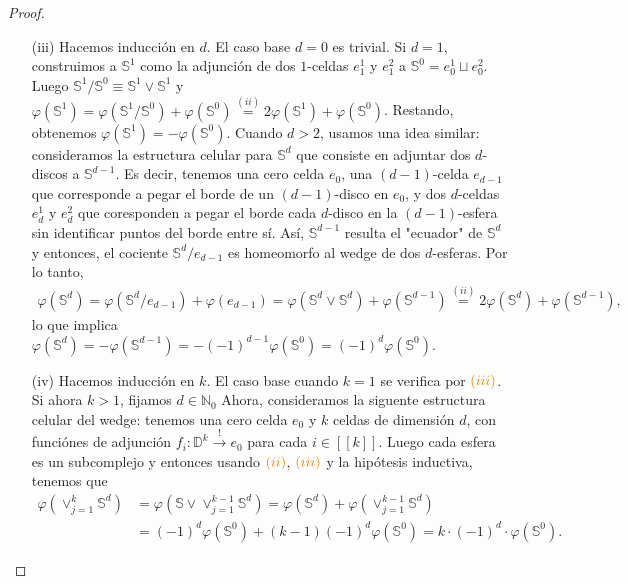 \documentclass[11pt]{article}
\newcommand{\N}{\mathbb{N}}
\newcommand{\D}{\mathbb{D}}
\newcommand{\Ss}{\mathbb{S}}
\newcommand{\nat}[1]{[\![#1]\!]}
\newcommand{\paint}[1]{\color{color}{#1}}
\begin{document}
\begin{proof}
\begin{itemize}
\item[(iii)] Hacemos inducci\'on en $d$. El caso base $d = 0$ es trivial. Si $d = 1$, construimos a $\Ss^1$ como la adjunci\'on de dos $1$-celdas $e_1^1$ y $e_1^2$ a $\Ss^0 = e_0^1 \sqcup e_0^2$. Luego $\Ss^1/\Ss^0 \equiv \Ss^1 \vee \Ss^1$ y $\varphi(\Ss^1) = \varphi(\Ss^1/\Ss^0) + \varphi(\Ss^0) \stackrel{(ii)}{=} 2\varphi(\Ss^1) + \varphi(\Ss^0)$. Restando, obtenemos $\varphi(\Ss^1) = -\varphi(\Ss^0)$. Cuando $d >2$, usamos una idea similar: consideramos la estructura celular para $\Ss^d$ que consiste en adjuntar dos $d$-discos a $\Ss^{d-1}$. Es decir, tenemos una cero celda $e_0$, una $(d-1)$-celda $e_{d-1}$ que corresponde a pegar el borde de un $(d-1)$-disco en $e_0$, y dos $d$-celdas $e_d^1$ y $e_d^2$ que coresponden a pegar el borde cada $d$-disco en la $(d-1)$-esfera sin identificar puntos del borde entre s\'i. As\'i, $\Ss^{d-1}$ resulta el "ecuador" de $\Ss^{d}$ y entonces, el cociente $\Ss^d/e_{d-1}$ es homeomorfo al wedge de dos $d$-esferas. Por lo tanto, 
\begin{align*}
\varphi(\Ss^d) = \varphi(\Ss^d/e_{d-1}) + \varphi(e_{d-1}) = \varphi(\Ss^d \vee \Ss^d) + \varphi(\Ss^{d-1}) \stackrel{(ii)}{=} 2\varphi(\Ss^d) + \varphi(\Ss^{d-1}),
\end{align*}
lo que implica $\varphi(\Ss^d) = - \varphi(\Ss^{d-1}) = -(-1)^{d-1}\varphi(\Ss^0) = (-1)^d\varphi(\Ss^0)$.
\item[(iv)] Hacemos inducci\'on en $k$. El caso base cuando $k=1$ se verifica por $\paint{(iii)}$. Si ahora $k  > 1$, fijamos $d \in \N_0$ Ahora, consideramos la siguente estructura celular del wedge: tenemos una cero celda $e_0$ y $k$ celdas de dimensi\'on $d$, con funci\'ones de adjunci\'on $f_i : \D^k \xrightarrow{!} e_0$ para cada $i \in \nat{k}$. Luego cada esfera es un subcomplejo y entonces usando $\paint{(ii)}$, $\paint{(iii)}$ y la hip\'otesis inductiva, tenemos que
\begin{align*}
\varphi(\vee_{j =1}^k\Ss^d) &= \varphi(\Ss \vee \vee_{j =1}^{k-1}\Ss^d) = \varphi(\Ss^d) + \varphi(\vee_{j =1}^{k-1}\Ss^d) \\
&= (-1)^d\varphi(\Ss^0) + (k-1)(-1)^d\varphi(\Ss^0) = k \cdot (-1)^d \cdot \varphi(\Ss^0).
\end{align*}
\end{itemize}
\end{proof}
\newpage
\end{document}
